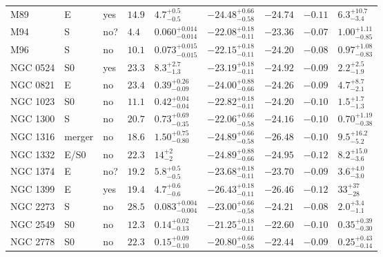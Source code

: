 \begin{table*}
\begin{center}
\begin{tabular}{lllllllll}
M89  &  E  &  yes   &  $14.9$  &  $4.7_{-0.5}^{+0.5}$   &  $-24.48_{-0.58}^{+0.66}$   &  $-24.74$   &  $-0.11$  &  $6.3_{-3.4}^{+10.7}$   \\ 
M94  &  S  &  no?  &  $4.4$  &  $0.060_{-0.014}^{+0.014}$   &  $-22.08_{-0.11}^{+0.18}$   &  $-23.36$   &  $-0.07$  &  $1.00_{-0.85}^{+1.11}$   \\ 
M96  &  S  &  no   &  $10.1$  &  $0.073_{-0.015}^{+0.015}$   &  $-22.15_{-0.11}^{+0.18}$   &  $-24.20$   &  $-0.08$  &  $0.97_{-0.83}^{+1.08}$   \\ 
NGC 0524  &  S0  &  yes   &  $23.3$  &  $8.3_{-1.3}^{+2.7}$   &  $-23.19_{-0.11}^{+0.18}$   &  $-24.92$   &  $-0.09$  &  $2.2_{-1.9}^{+2.5}$   \\ 
NGC 0821  &  E  &  no   &  $23.4$  &  $0.39_{-0.09}^{+0.26}$   &  $-24.00_{-0.66}^{+0.88}$   &  $-24.26$   &  $-0.09$  &  $4.7_{-2.1}^{+8.7}$   \\ 
NGC 1023  &  S0  &  no   &  $11.1$  &  $0.42_{-0.04}^{+0.04}$   &  $-22.82_{-0.11}^{+0.18}$   &  $-24.20$   &  $-0.10$  &  $1.5_{-1.3}^{+1.7}$   \\ 
NGC 1300  &  S  &  no   &  $20.7$  &  $0.73_{-0.35}^{+0.69}$   &  $-22.06_{-0.58}^{+0.66}$   &  $-24.16$   &  $-0.10$  &  $0.70_{-0.38}^{+1.19}$   \\ 
NGC 1316  &  merger  &  no   &  $18.6$  &  $1.50_{-0.80}^{+0.75}$   &  $-24.89_{-0.58}^{+0.66}$   &  $-26.48$   &  $-0.10$  &  $9.5_{-5.2}^{+16.2}$   \\ 
NGC 1332  &  E/S0  &  no   &  $22.3$  &  $14_{-2}^{+2}$   &  $-24.89_{-0.66}^{+0.88}$   &  $-24.95$   &  $-0.12$  &  $8.2_{-3.6}^{+15.0}$   \\ 
NGC 1374  &  E  &  no?  &  $19.2$  &  $5.8_{-0.5}^{+0.5}$   &  $-23.68_{-0.11}^{+0.18}$   &  $-23.70$   &  $-0.09$  &  $3.6_{-3.0}^{+4.0}$   \\ 
NGC 1399  &  E  &  yes   &  $19.4$  &  $4.7_{-0.6}^{+0.6}$   &  $-26.43_{-0.11}^{+0.18}$   &  $-26.46$   &  $-0.12$  &  $33_{-28}^{+37}$   \\ 
NGC 2273  &  S  &  no   &  $28.5$  &  $0.083_{-0.004}^{+0.004}$   &  $-23.00_{-0.58}^{+0.66}$   &  $-24.21$   &  $-0.08$  &  $2.0_{-1.1}^{+3.4}$   \\ 
NGC 2549  &  S0  &  no   &  $12.3$  &  $0.14_{-0.13}^{+0.02}$   &  $-21.25_{-0.11}^{+0.18}$   &  $-22.60$   &  $-0.10$  &  $0.35_{-0.30}^{+0.39}$   \\ 
NGC 2778  &  S0  &  no   &  $22.3$  &  $0.15_{-0.10}^{+0.09}$   &  $-20.80_{-0.58}^{+0.66}$   &  $-22.44$   &  $-0.09$  &  $0.25_{-0.14}^{+0.43}$   \\ 

\end{tabular}
\end{center}
\end{table*}
